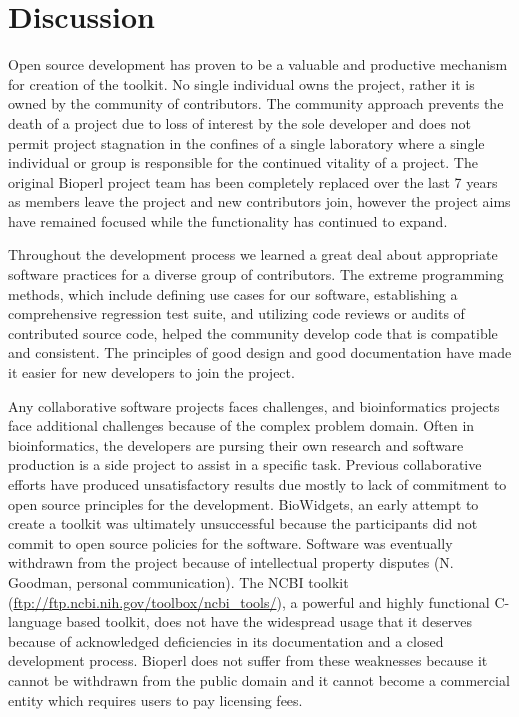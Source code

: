 \documentclass[12pt]{article}
\begin{document}
\section{Discussion}

Open source development has proven to be a valuable and productive
mechanism for creation of the toolkit.  No single individual owns the
project, rather it is owned by the community of contributors.  The
community approach prevents the death of a project due to loss of
interest by the sole developer and does not permit project stagnation
in the confines of a single laboratory where a single individual or
group is responsible for the continued vitality of a project.  The
original Bioperl project team has been completely replaced over the
last 7 years as members leave the project and new contributors join,
however the project aims have remained focused while the
functionality has continued to expand.

Throughout the development process we learned a great deal about
appropriate software practices for a diverse group of contributors.
The extreme programming methods, which include defining use cases for
our software, establishing a comprehensive regression test suite, and
utilizing code reviews or audits of contributed source code, helped
the community develop code that is compatible and consistent.  The
principles of good design and good documentation have made it easier
for new developers to join the project.

Any collaborative software projects faces challenges, and
bioinformatics projects face additional challenges because of the complex
problem domain.  Often in bioinformatics, the developers are pursing
their own research and software production is a side project to assist
in a specific task.  Previous collaborative efforts have produced
unsatisfactory results due mostly to lack of commitment to open source
principles for the development.  BioWidgets, an early attempt to
create a toolkit was ultimately unsuccessful because the participants did
not commit to open source policies for the software.  Software was
eventually withdrawn from the project because of intellectual property
disputes (N. Goodman, personal communication).  The NCBI toolkit
(\url{ftp://ftp.ncbi.nih.gov/toolbox/ncbi_tools/}), a powerful and highly functional C-language based
toolkit, does not have the widespread usage that it deserves
because of acknowledged deficiencies in its documentation and a closed
development process.  Bioperl does not suffer from these weaknesses
because it cannot be withdrawn from the public domain and it cannot
become a commercial entity which requires users to pay licensing
fees.
\end{document}
